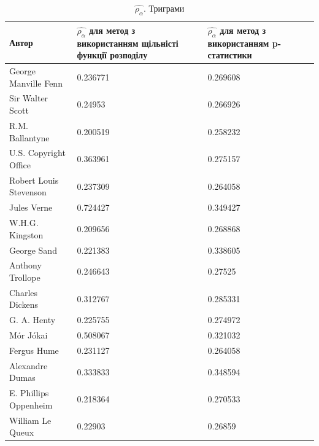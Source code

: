 \documentclass[12pt, a4paper]{extarticle}
\begin{document}
\begin{center}
\begin{table}
\begin{tabular}{|p{11em}|p{10em}|p{10em}|}
\hline
Автор & $\hat{\rho_\alpha}$ для метод з використанням щільністі функції розподілу & $\hat{\rho_\alpha}$ для метод з використанням p-статистики\\
\hline
George Manville Fenn & 0.236771 & 0.269608\\
Sir Walter Scott & 0.24953 & 0.266926\\
R.M. Ballantyne & 0.200519 & 0.258232\\
U.S. Copyright Office & 0.363961 & 0.275157\\
Robert Louis Stevenson & 0.237309 & 0.264058\\
Jules Verne & 0.724427 & 0.349427\\
W.H.G. Kingston & 0.209656 & 0.268868\\
George Sand & 0.221383 & 0.338605\\
Anthony Trollope & 0.246643 & 0.27525\\
Charles Dickens & 0.312767 & 0.285331\\
G. A. Henty & 0.225755 & 0.274972\\
Mór Jókai & 0.508067 & 0.321032\\
Fergus Hume & 0.231127 & 0.264058\\
Alexandre Dumas & 0.333833 & 0.348594\\
E. Phillips Oppenheim & 0.218364 &0.270533\\
William Le Queux & 0.22903 & 0.26859\\
\hline
\end{tabular}
\caption{$\hat{\rho_\alpha}$. Триграми}
\label{tab:8}
\end{table}
\end{center}
\end{document}
